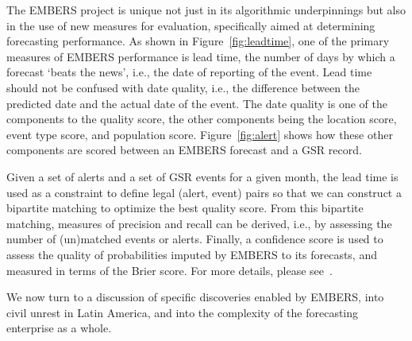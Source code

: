 The EMBERS project is unique not just in its algorithmic underpinnings but also in the use of new measures
for evaluation, specifically aimed at determining forecasting performance. As
shown in Figure~\ref{fig:leadtime},
one of the primary measures of EMBERS performance is lead time, the number of days by which a forecast
`beats the news', i.e., the date of reporting of the event. Lead time should not be confused with
date quality, i.e., the difference between the predicted date and the actual date of the event. The date
quality is one of the components to the quality score, the other components being the
location score, event type score, and population score.
Figure~\ref{fig:alert} 
shows how these other
components are scored between an EMBERS forecast and a GSR record.

Given a set of alerts and a set of
GSR events for a given month, the lead time is used as a constraint to define legal (alert, event) pairs so that
we can construct a bipartite matching to optimize the best quality
score. From this bipartite matching,
measures of precision and recall can be derived, i.e., by assessing the number of (un)matched events or
alerts. Finally, a confidence score is used to assess the quality of probabilities imputed by EMBERS to its
forecasts, and measured in terms of the Brier score. For more details, please
see~\cite{kdd:beating-the-news}.

We now turn to a discussion of specific discoveries enabled by EMBERS, into civil unrest in Latin America, and into
the complexity of the forecasting enterprise as a whole.

